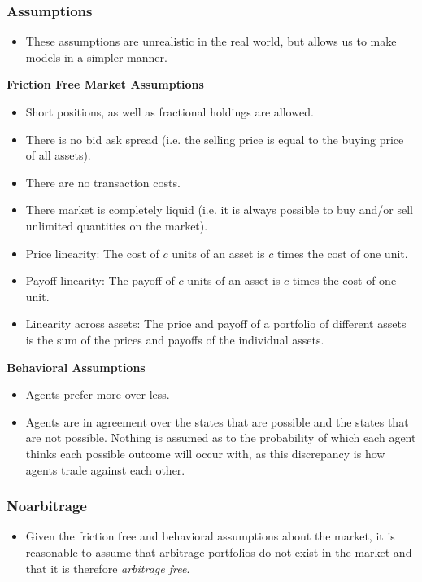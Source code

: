 \documentclass[11pt]{article}
\begin{document}
\subsubsection{Assumptions}
\begin{itemize}
    \item These assumptions are unrealistic in the real world, but allows us to make models in 
    a simpler manner.
\end{itemize}

\textbf{Friction Free Market Assumptions}
\begin{itemize}
    \item Short positions, as well as fractional holdings are allowed. 
    \item There is no bid ask spread (i.e. the selling price is equal to the buying price of
    all assets).
    \item There are no transaction costs. 
    \item There market is completely liquid (i.e. it is always possible to buy and/or sell 
    unlimited quantities on the market).
    \item Price linearity: The cost of $c$ units of an asset is $c$ times the cost of one unit.
    \item Payoff linearity: The payoff of $c$ units of an asset is $c$ times the cost of one 
    unit.
    \item Linearity across assets: The price and payoff of a portfolio of different assets is 
    the sum of the prices and payoffs of the individual assets. 
\end{itemize}

\textbf{Behavioral Assumptions}
\begin{itemize}
    \item Agents prefer more over less. 
    \item Agents are in agreement over the states that are possible and the states that are not 
    possible. Nothing is assumed as to the probability of which each agent thinks each possible 
    outcome will occur with, as this discrepancy is how agents trade against each other.
\end{itemize}

\subsubsection{Noarbitrage}

\begin{itemize}
    \item Given the friction free and behavioral assumptions about the market, it is reasonable 
    to assume that arbitrage portfolios do not exist in the market and that it is therefore 
    \textit{arbitrage free}.
\end{itemize}
\end{document}
